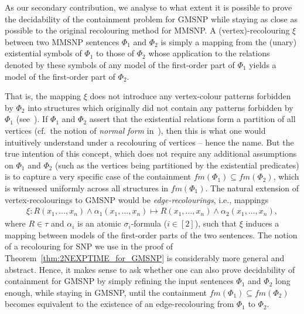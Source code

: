 \documentclass[oneside,reqno,12pt]{amsart}
\theoremstyle{plain}
\theoremstyle{remark}
\newcommand{\fm}{\ensuremath{\mathit{fm}}\xspace}
\begin{document}
As our secondary contribution, we analyse to what extent it is possible to prove the decidability of the containment problem for GMSNP while staying as close as possible to the original recolouring method for MMSNP.
A (vertex)-recolouring $\xi$ between two MMSNP sentences $\Phi_1$ and $\Phi_2$ is simply a mapping 
 from the (unary) 
 existential  symbols of $\Phi_1$ 
  to those of  $\Phi_2$ whose application to the relations denoted by these symbols of any model of the first-order part of $\Phi_1$ yields a model of the first-order part of $\Phi_2$. {That is, the mapping $\xi$  does not introduce any vertex-colour patterns forbidden by $\Phi_2$ into structures which originally did not contain any patterns forbidden by $\Phi_1$ (see~\cite[Definition~4.25]{bodirsky2018_article}).
If $\Phi_1$ and $\Phi_2$ assert that the existential relations form a partition of all vertices (cf.~the notion of   \emph{normal form} in~\cite{bodirsky2018_article}), then this is what one would intuitively understand under a recolouring of vertices -- hence the name. 
But the true intention of this concept, which does not require any additional assumptions
on $\Phi_1$ and $\Phi_2$ (such as the vertices being partitioned by the existential predicates) is to capture a very specific case of the containment $\fm(\Phi_1) \subseteq \fm(\Phi_2)$, which is witnessed uniformly across all structures in $\fm(\Phi_1)$.
The natural extension of vertex-recolourings to GMSNP would be \emph{edge-recolourings}, i.e., mappings 
\begin{align}
 \xi \colon R(x_1,\dots, x_n) \wedge \alpha_1(x_1,\dots, x_n)  \mapsto R(x_1,\dots, x_n) \wedge \alpha_2(x_1,\dots, x_n), \label{eq:edge_recolouring}
\end{align} 
where $R\in \tau$ and $\alpha_i$ is an atomic $\sigma_i$-formula ($i\in [2]$), 
 such that $\xi$ induces a mapping between models of the first-order parts of the two sentences. The notion of a recolouring for SNP we use in the proof of Theorem~\ref{thm:2NEXPTIME_for_GMSNP} is considerably more general and  abstract.
Hence, it makes sense to ask whether one can also prove decidability of containment for GMSNP by simply refining
the input sentences $\Phi_1$ and $\Phi_2$ long enough, while staying in GMSNP, until the containment $\fm(\Phi_1)\subseteq \fm(\Phi_2)$ becomes equivalent to the existence of an edge-recolouring from $\Phi_1$ to $\Phi_2$. 

}
\end{document}
